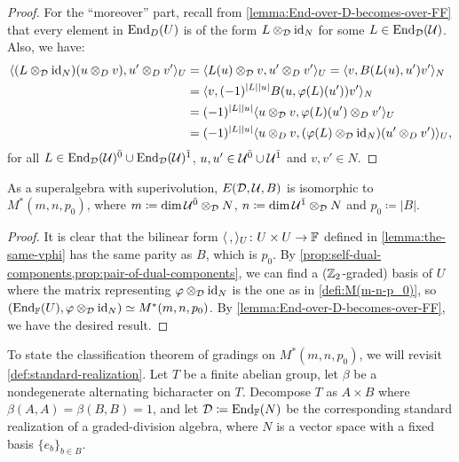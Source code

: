 \begin{proof}
    For the ``moreover'' part, recall from \cref{lemma:End-over-D-becomes-over-FF} that every element in $\operatorname{End}_D(U)$ is of the form $L\otimes_{\mathcal{D}} \operatorname{id}_N$ for some $L \in \operatorname{End}_{\mathcal{D}} (\mathcal U)$. 
    Also, we have:
    \begin{align}
        \langle (L\otimes_{\mathcal{D}} \operatorname{id}_N) (u \otimes_D v), u' \otimes_D v' \rangle_U 
        &= \langle L(u) \otimes_{\mathcal{D}} v, u' \otimes_D v' \rangle_U 
        = \langle v, B(L(u), u') v' \rangle_N \\
        &= \langle v, (-1)^{|L||u|} B(u, \varphi(L) (u')) v' \rangle_N \\
        &= (-1)^{|L||u|} \langle u \otimes_{\mathcal{D}} v, \varphi(L) (u') \otimes_D v' \rangle_U \\
        &= (-1)^{|L||u|} \langle  u \otimes_D v, ( \varphi(L)\otimes_{\mathcal{D}} \operatorname{id}_N) (u' \otimes_D v') \rangle_U,
    \end{align}
    for all $L \in \operatorname{End}_{\mathcal{D}} (\mathcal U)^{\bar0} \cup \operatorname{End}_{\mathcal{D}} (\mathcal U)^{\bar1}$, $u, u'\in \mathcal U^{\bar0} \cup \mathcal U^{\bar1}$ and $v,v' \in N$. 
\end{proof}

\begin{prop}\label{prop:g_0-goes-to-p_0}
    As a superalgebra with superivolution, $E(\mathcal{D}, \mathcal U, B)$ is isomorphic to $M^*(m,n, p_0)$, where $m \coloneqq \dim \mathcal U^{\bar0} \otimes_{\mathcal{D}} N$, $n \coloneqq \dim \mathcal U^{\bar1} \otimes_{\mathcal{D}} N$ and $p_0 \coloneqq |B|$.
\end{prop}

\begin{proof}
    It is clear that the bilinear form $\langle \, , \rangle_U \colon U\times U \to \mathbb{F}$ defined in \cref{lemma:the-same-vphi} has the same parity as $B$, which is $p_0$. 
    By \cref{prop:self-dual-components,prop:pair-of-dual-components}, we can find a ($\mathbb{Z}_2$-graded) basis of $U$ where the matrix representing $\varphi \otimes_{\mathcal{D}} \operatorname{id}_N$ is the one as in \cref{defi:M(m-n-p_0)}, so $(\operatorname{End}_{\mathbb{F}} (U), \varphi \otimes_{\mathcal{D}} \operatorname{id}_N) \simeq M^*(m, n, p_0)$. 
    By \cref{lemma:End-over-D-becomes-over-FF}, we have the desired result. 
\end{proof}

To state the classification theorem of gradings on $M^*(m,n, p_0)$, we will revisit \cref{def:standard-realization}. 
Let $T$ be a finite abelian group, let $\beta$ be a nondegenerate alternating bicharacter on $T$. 
Decompose $T$ as $A\times B$ where $\beta(A,A) = \beta(B,B) = 1$, and let $\mathcal{D} \coloneqq \operatorname{End}_{\mathbb{F}} (N)$ be the corresponding standard realization of a graded-division algebra, where $N$ is a vector space with a fixed basis $\{ e_b \}_{b\in B}$. 

